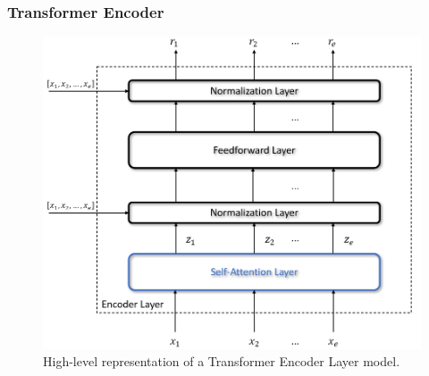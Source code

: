             \subsubsection{Transformer Encoder}
            \label{subsub:trans_encoder}
                \begin{figure}[!t]
                    \centering
                    \includegraphics[width=15cm, keepaspectratio]{images/an/transformer_encoder.png}
                    \caption{High-level representation of a Transformer Encoder Layer model.}
                    \label{fig:an_transformer_encoder}
                \end{figure}
                
